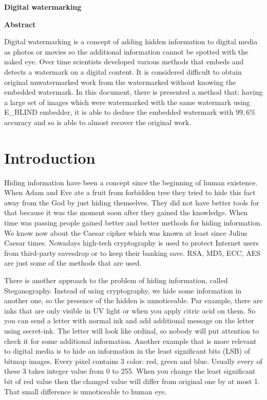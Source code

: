 \documentclass[a4paper,12pt]{article}
\begin{document}
\begin{center}
 \Large
 \textbf{Digital watermarking}
 
 \vspace{1cm}
 
 \small
 \textbf{Abstract}

 \vspace{0.25cm}
 
\begin{minipage}{10cm}
\normalsize
Digital watermarking is a concept of adding hidden information to digital media
as photos or movies so the additional information cannot be spotted with
the naked eye. Over time scientists developed various methods that embeds and
detects a watermark on a digital content. It is considered difficult to
obtain original unwatermarked work from the watermarked without knowing the
embedded watermark. In this document, there is presented a method that: having
a large set of images which were watermarked with the same watermark using
E\_BLIND embedder, it is able to deduce the embedded watermark with $99,6$\%
accuracy and so is able to almost recover the original work.
\end{minipage}
\end{center}

\newpage

\normalsize

\section{Introduction}

Hiding information have been a concept since the beginning of human existence.
When Adam and Eve ate a fruit from forbidden tree they tried to hide this fact
away from the God by just hiding themselves. They did not have better tools for that
because it was the moment soon after they gained the knowledge. When time was
passing people gained better and better methods for hiding information. We know
now about the Caesar cipher which was known at least since Julius Caesar times.
Nowadays high-tech cryptography is used to protect Internet users from
third-party eavesdrop or to keep their banking save. RSA, MD5, ECC, AES are just
some of the methods that are used.

There is another approach to the problem of hiding information, called
Steganography. Instead of using cryptography, we hide some information in another
one, so the presence of the hidden is unnoticeable. Par example, there are inks
that are only visible in UV light or when you apply citric acid on them. So you
can send a letter with normal ink and add additional message on the letter using
secret-ink. The letter will look like ordinal, so nobody will put attention to
check it for some additional information. Another
example that is more relevant to digital media is to hide an information in the
least significant bits (LSB) of bitmap images. Every pixel contains 3 color:
red, green and blue. Usually every of these 3 takes integer value from 0 to 255.
When you change the least significant bit of red value then the changed value
will differ from original one by at most 1. That small difference is
unnoticeable to human eye.
\end{document}
